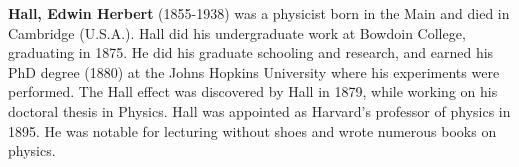 {}
\label{sec:H}

\textbf{Hall, Edwin Herbert} (1855-1938) was a physicist born in the Main and died in Cambridge (U.S.A.). Hall did his undergraduate work at Bowdoin College, graduating in 1875. He did his graduate schooling and research, and earned his PhD degree (1880) at the Johns Hopkins University where his experiments were performed. The Hall effect was discovered by Hall in 1879, while working on his doctoral thesis in Physics. Hall was appointed as Harvard's professor of physics in 1895. He was notable for lecturing without shoes and wrote numerous books on physics.\\

